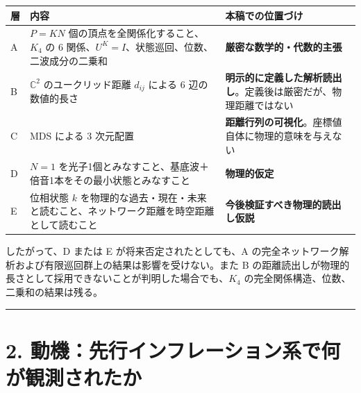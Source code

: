 \documentclass[
  a4paper,
]{ltjsarticle}
\newcounter{none} %
\begin{document}
{\def\LTcaptype{none} %
\begin{longtable}[]{@{}
  >{\raggedright\arraybackslash}p{}
  >{\raggedright\arraybackslash}p{}
  >{\raggedright\arraybackslash}p{}@{}}
\toprule\noalign{}
\begin{minipage}[b]{\linewidth}\raggedright
層
\end{minipage} & \begin{minipage}[b]{\linewidth}\raggedright
内容
\end{minipage} & \begin{minipage}[b]{\linewidth}\raggedright
本稿での位置づけ
\end{minipage} \\
\midrule\noalign{}
\endhead
\bottomrule\noalign{}
\endlastfoot
A & \(P=KN\) 個の頂点を全関係化すること、\(K_4\) の 6
関係、\(U^K=I\)、状態巡回、位数、二波成分の二乗和 &
\textbf{厳密な数学的・代数的主張} \\
B & \(\mathbb C^2\) のユークリッド距離 \(d_{ij}\) による 6
辺の数値的長さ &
\textbf{明示的に定義した解析読出し}。定義後は厳密だが、物理距離ではない \\
C & MDS による 3 次元配置 &
\textbf{距離行列の可視化}。座標値自体に物理的意味を与えない \\
D & \(N=1\)
を光子1個とみなすこと、基底波＋倍音1本をその最小状態とみなすこと &
\textbf{物理的仮定} \\
E & 位相状態 \(k\)
を物理的な過去・現在・未来と読むこと、ネットワーク距離を時空距離として読むこと
& \textbf{今後検証すべき物理的読出し仮説} \\
\end{longtable}
}

したがって、D または E が将来否定されたとしても、A
の完全ネットワーク解析および有限巡回群上の結果は影響を受けない。また B
の距離読出しが物理的長さとして採用できないことが判明した場合でも、\(K_4\)
の完全関係構造、位数、二乗和の結果は残る。

\begin{center}\rule{0.5\linewidth}{0.5pt}\end{center}

\section{2.
動機：先行インフレーション系で何が観測されたか}\label{ux52d5ux6a5fux5148ux884cux30a4ux30f3ux30d5ux30ecux30fcux30b7ux30e7ux30f3ux7cfbux3067ux4f55ux304cux89b3ux6e2cux3055ux308cux305fux304b}
\end{document}
